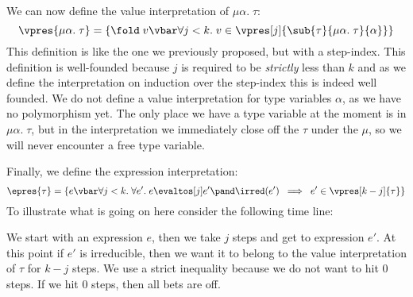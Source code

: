 We can now define the value interpretation of $\mu\alpha. \; \tau$:
\[
  \vpres{\mu\alpha.\; \tau} = \{\fold \; v \vbar \forall j < k. \; v \in \vpres[j]{\sub{\tau}{\mu\alpha.\;\tau}{\alpha}} \}
\]
This definition is like the one we previously proposed, but with a step-index. This definition is well-founded because $j$ is required to be \emph{strictly} less than $k$ and as we define the interpretation on induction over the step-index this is indeed well founded. We do not define a value interpretation for type variables $\alpha$, as we have no polymorphism yet. The only place we have a type variable at the moment is in $\mu\alpha. \; \tau$, but in the interpretation we immediately close off the $\tau$ under the $\mu$, so we will never encounter a free type variable.

Finally, we define the expression interpretation:
\[
  \epres{\tau} = \{e \vbar \forall j < k. \; \forall e'. \; e \evaltos[j] e' \pand \irred(e') \; \implies \; e' \in \vpres[k-j]{\tau}\}
\]
To illustrate what is going on here consider the following time line: \\
\begin{center}
\end{center}
We start with an expression $e$, then we take $j$ steps and get to expression $e'$. At this point if $e'$ is irreducible, then we want it to belong to the value interpretation of $\tau$ for $k-j$ steps. We use a strict inequality because we do not want to hit 0 steps. If we hit 0 steps, then all bets are off.%

